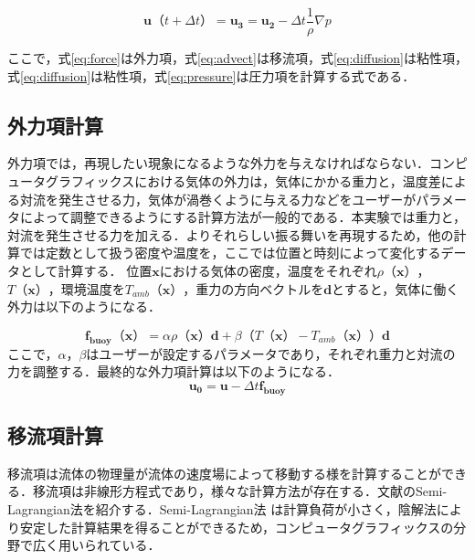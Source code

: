 \documentclass[a4j,12pt]{jreport}
\begin{document}
\begin{equation}\label{eq:pressure}
	\bm{u} （t + \varDelta t）= \bm{u_3}  =  \bm{u_2} - \varDelta t \frac{1}{\rho}\nabla p
\end{equation} 

ここで，式\ref{eq:force}は外力項，式\ref{eq:advect}は移流項，式\ref{eq:diffusion}は粘性項，式\ref{eq:diffusion}は粘性項，式\ref{eq:pressure}は圧力項を計算する式である．
\subsection{外力項計算}
外力項では，再現したい現象になるような外力を与えなければならない．コンピュータグラフィックスにおける気体の外力は，気体にかかる重力と，温度差による対流を発生させる力，気体が渦巻くように与える力などをユーザーがパラメータによって調整できるようにする計算方法が一般的である．本実験では重力と，対流を発生させる力を加える．よりそれらしい振る舞いを再現するため，他の計算では定数として扱う密度や温度を，ここでは位置と時刻によって変化するデータとして計算する．
位置$\bm{x}$における気体の密度，温度をそれぞれ$\rho（\bm{x}）$，$T（\bm{x}）$，環境温度を$T_{amb}（\bm{x}）$，重力の方向ベクトルを$\bm{d}$とすると，気体に働く外力は以下のようになる．

\begin{equation}\label{eq:buoyancy}
	\bm{f_{buoy}（\bm{x}）} =  \alpha \rho（\bm{x}）\bm{d}+ \beta（T（\bm{x}）- T_{amb}（\bm{x}））\bm{d}
\end{equation} 
ここで，$\alpha$，$\beta$はユーザーが設定するパラメータであり，それぞれ重力と対流の力を調整する．最終的な外力項計算は以下のようになる．
\begin{equation}
	\bm{u_0} =  \bm{u}  - \varDelta t \bm{f_{buoy}} 
\end{equation} 


\subsection{移流項計算}
移流項は流体の物理量が流体の速度場によって移動する様を計算することができる．移流項は非線形方程式であり，様々な計算方法が存在する．文献\cite{fedkiw}のSemi-Lagrangian法を紹介する．Semi-Lagrangian法
は計算負荷が小さく，陰解法により安定した計算結果を得ることができるため，コンピュータグラフィックスの分野で広く用いられている．
\end{document}
